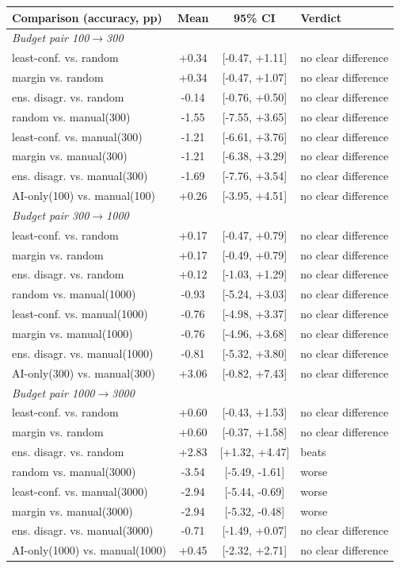 \begin{tabular}{lccl}
\toprule
Comparison (accuracy, pp) & Mean & 95\% CI & Verdict \\
\midrule
\multicolumn{4}{l}{\emph{Budget pair 100$\to$300}} \\
least-conf. vs. random & +0.34 & [-0.47, +1.11] & no clear difference \\
margin vs. random & +0.34 & [-0.47, +1.07] & no clear difference \\
ens. disagr. vs. random & -0.14 & [-0.76, +0.50] & no clear difference \\
random vs. manual(300) & -1.55 & [-7.55, +3.65] & no clear difference \\
least-conf. vs. manual(300) & -1.21 & [-6.61, +3.76] & no clear difference \\
margin vs. manual(300) & -1.21 & [-6.38, +3.29] & no clear difference \\
ens. disagr. vs. manual(300) & -1.69 & [-7.76, +3.54] & no clear difference \\
AI-only(100) vs. manual(100) & +0.26 & [-3.95, +4.51] & no clear difference \\
\multicolumn{4}{l}{\emph{Budget pair 300$\to$1000}} \\
least-conf. vs. random & +0.17 & [-0.47, +0.79] & no clear difference \\
margin vs. random & +0.17 & [-0.49, +0.79] & no clear difference \\
ens. disagr. vs. random & +0.12 & [-1.03, +1.29] & no clear difference \\
random vs. manual(1000) & -0.93 & [-5.24, +3.03] & no clear difference \\
least-conf. vs. manual(1000) & -0.76 & [-4.98, +3.37] & no clear difference \\
margin vs. manual(1000) & -0.76 & [-4.96, +3.68] & no clear difference \\
ens. disagr. vs. manual(1000) & -0.81 & [-5.32, +3.80] & no clear difference \\
AI-only(300) vs. manual(300) & +3.06 & [-0.82, +7.43] & no clear difference \\
\multicolumn{4}{l}{\emph{Budget pair 1000$\to$3000}} \\
least-conf. vs. random & +0.60 & [-0.43, +1.53] & no clear difference \\
margin vs. random & +0.60 & [-0.37, +1.58] & no clear difference \\
ens. disagr. vs. random & +2.83 & [+1.32, +4.47] & beats \\
random vs. manual(3000) & -3.54 & [-5.49, -1.61] & worse \\
least-conf. vs. manual(3000) & -2.94 & [-5.44, -0.69] & worse \\
margin vs. manual(3000) & -2.94 & [-5.32, -0.48] & worse \\
ens. disagr. vs. manual(3000) & -0.71 & [-1.49, +0.07] & no clear difference \\
AI-only(1000) vs. manual(1000) & +0.45 & [-2.32, +2.71] & no clear difference \\
\bottomrule
\end{tabular}
